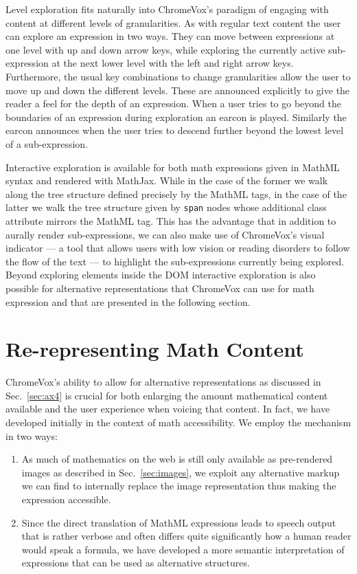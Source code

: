 \documentclass{sig-alternate}
\begin{document}
Level exploration fits naturally into ChromeVox's paradigm of engaging with
content at different levels of granularities. As with regular text content the
user can explore an expression in two ways. They can move between expressions at
one level with up and down arrow keys, while exploring the currently active
sub-expression at the next lower level with the left and right arrow
keys. Furthermore, the usual key combinations to change granularities allow the
user to move up and down the different levels. These are announced explicitly to
give the reader a feel for the depth of an expression.  When a user tries to go
beyond the boundaries of an expression during exploration an earcon is
played. Similarly the earcon announces when the user tries to descend further
beyond the lowest level of a sub-expression.

Interactive exploration is available for both math expressions given in MathML
syntax and rendered with MathJax. While in the case of the former we walk along
the tree structure defined precisely by the MathML tags, in the case of the
latter we walk the tree structure given by \texttt{span} nodes whose additional
class attribute mirrors the MathML tag. This has the advantage that in addition
to aurally render sub-expressions, we can also make use of ChromeVox's visual
indicator --- a tool that allows users with low vision or reading disorders to
follow the flow of the text --- to highlight the sub-expressions currently being
explored. Beyond exploring elements inside the DOM interactive exploration is
also possible for alternative representations that ChromeVox can use for math
expression and that are presented in the following section.

\section{Re-representing Math Content}
\label{sec:alternative}

ChromeVox's ability to allow for alternative representations as discussed in
Sec.~\ref{sec:ax4} is crucial for both enlarging the amount mathematical content
available and the user experience when voicing that content. In fact, we have
developed initially in the context of math accessibility.  We employ the
mechanism in two ways:
\begin{enumerate}
\item As much of mathematics on the web is still only available as
  pre-rendered images as described in Sec.~\ref{sec:images}, we exploit any
  alternative markup we can find to internally replace the image representation
  thus making the expression accessible.
\item Since the direct translation of MathML expressions leads to speech output
  that is rather verbose and often differs quite significantly how a human
  reader would speak a formula, we have developed a more semantic interpretation
  of expressions that can be used as alternative structures.
\end{enumerate}
\end{document}

